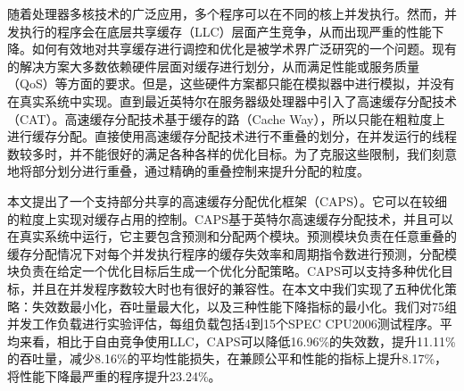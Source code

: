 
\begin{cabstract}
随着处理器多核技术的广泛应用，多个程序可以在不同的核上并发执行。然而，并发执行的程序会在底层共享缓存（LLC）层面产生竞争，从而出现严重的性能下降。如何有效地对共享缓存进行调控和优化是被学术界广泛研究的一个问题。现有的解决方案大多数依赖硬件层面对缓存进行划分，从而满足性能或服务质量（QoS）等方面的要求。但是，这些硬件方案都只能在模拟器中进行模拟，并没有在真实系统中实现。直到最近英特尔在服务器级处理器中引入了高速缓存分配技术（CAT）。高速缓存分配技术基于缓存的路（Cache Way），所以只能在粗粒度上进行缓存分配。直接使用高速缓存分配技术进行不重叠的划分，在并发运行的线程数较多时，并不能很好的满足各种各样的优化目标。为了克服这些限制，我们刻意地将部分划分进行重叠，通过精确的重叠控制来提升分配的粒度。

本文提出了一个支持部分共享的高速缓存分配优化框架（CAPS）。它可以在较细的粒度上实现对缓存占用的控制。CAPS基于英特尔高速缓存分配技术，并且可以在真实系统中运行，它主要包含预测和分配两个模块。预测模块负责在任意重叠的缓存分配情况下对每个并发执行程序的缓存失效率和周期指令数进行预测，分配模块负责在给定一个优化目标后生成一个优化分配策略。CAPS可以支持多种优化目标，并且在并发程序数较大时也有很好的兼容性。在本文中我们实现了五种优化策略：失效数最小化，吞吐量最大化，以及三种性能下降指标的最小化。我们对75组并发工作负载进行实验评估，每组负载包括4到15个SPEC CPU2006测试程序。平均来看，相比于自由竞争使用LLC，CAPS可以降低16.96\%的失效数，提升11.11\%的吞吐量，减少8.16\%的平均性能损失，在兼顾公平和性能的指标上提升8.17\%，将性能下降最严重的程序提升23.24\%。
\end{cabstract}


